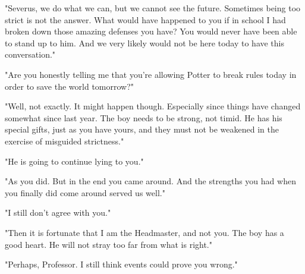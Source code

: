 "Severus, we do what we can, but we cannot see the future. Sometimes being too strict is not the answer. What would have happened to you if in school I had broken down those amazing defenses you have? You would never have been able to stand up to{\el} him. And we very likely would not be here today to have this conversation."

"Are you honestly telling me that you're allowing Potter to break rules today in order to save the world tomorrow?"

"Well, not exactly. It might happen though. Especially since things have changed somewhat since last year. The boy needs to be strong, not timid. He has his special gifts, just as you have yours, and they must not be weakened in the exercise of misguided strictness."

"He is going to continue lying to you."

"As you did. But in the end you came around. And the strengths you had when you finally did come around served us well."

"I still don't agree with you."

"Then it is fortunate that I am the Headmaster, and not you. The boy has a good heart. He will not stray too far from what is right."

"Perhaps, Professor. I still think events could prove you wrong."


